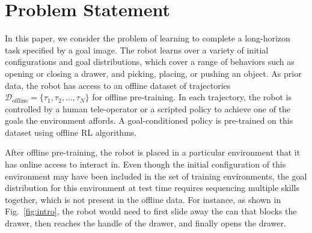 \section{Problem Statement}

In this paper, we consider the problem of learning to complete a long-horizon task specified by a goal image.
The robot learns over a variety of initial configurations and goal distributions, which cover a range of behaviors such as opening or closing a drawer, and picking, placing, or pushing an object.
As prior data, the robot has access to an offline dataset of trajectories $\mathcal{D}_\text{offline} = \{\tau_1, \tau_2, \dots, \tau_N\}$ for offline pre-training.
In each trajectory, the robot is controlled by a human tele-operator or a scripted policy to achieve one of the goals the environment affords.
A goal-conditioned policy is pre-trained on this dataset using offline RL algorithms. 

After offline pre-training, the robot is
placed in a particular environment that it has online access to interact in.
Even though the initial configuration of this environment may have been included in the set of training environments, the goal distribution for this environment at test time requires sequencing multiple skills together, which is not present in the offline data.
For instance, as shown in Fig.~\ref{fig:intro}, the robot would need to first slide away the can that blocks the drawer, then reaches the handle of the drawer, and finally opens the drawer. 

